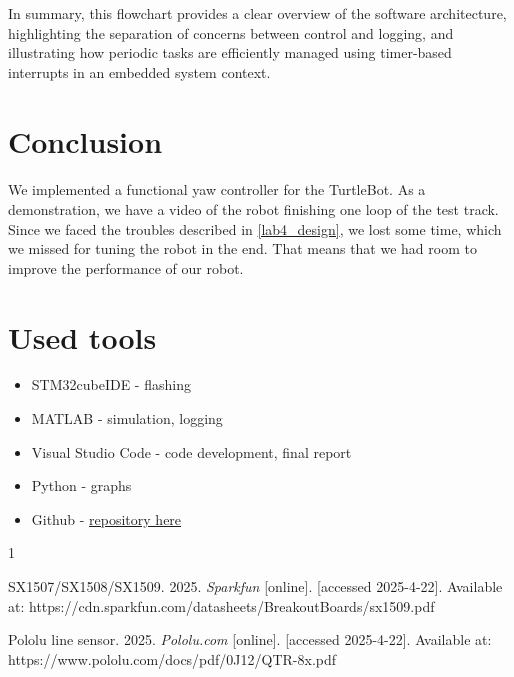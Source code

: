 \documentclass[english]{article}
\begin{document}
In summary, this flowchart provides a clear overview of the software architecture, highlighting the separation of concerns between control and logging, and illustrating how periodic tasks are efficiently managed using timer-based interrupts in an embedded system context.

\section{Conclusion}
\paragraph{}
We implemented a functional yaw controller for the TurtleBot. As a demonstration, we have a video of the robot
finishing one loop of the test track. Since we faced the troubles described in \ref{lab4_design}, we lost some time,
which we missed for tuning the robot in the end. That means that we had room to improve the performance of our robot.

\section{Used tools}
\begin{itemize}
	\item STM32cubeIDE - flashing
	\item MATLAB - simulation, logging
	\item Visual Studio Code - code development, final report
	\item Python - graphs
	\item Github - \href{https://github.com/internax/ERTC_report}{repository here}
\end{itemize}


\begin{thebibliography}{1}
	
	SX1507/SX1508/SX1509. 2025. \textit{Sparkfun} [online]. [accessed 2025-4-22]. Available at: https://cdn.sparkfun.com/datasheets/BreakoutBoards/sx1509.pdf
	
	Pololu line sensor. 2025. \textit{Pololu.com} [online]. [accessed 2025-4-22]. Available at: https://www.pololu.com/docs/pdf/0J12/QTR-8x.pdf

\end{thebibliography}
\end{document}
